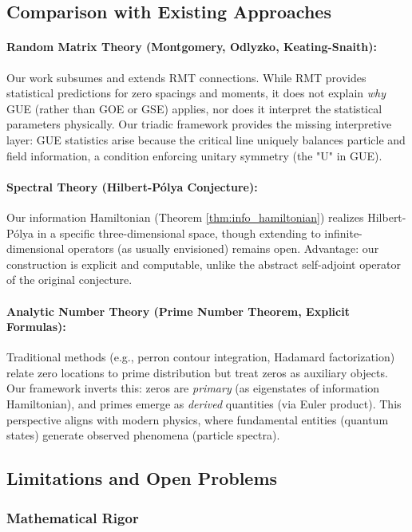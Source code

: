 \documentclass[12pt]{article}
\theoremstyle{plain}
\theoremstyle{definition}
\begin{document}
\subsection{Comparison with Existing Approaches}

\paragraph{Random Matrix Theory (Montgomery, Odlyzko, Keating-Snaith):}
Our work subsumes and extends RMT connections. While RMT provides statistical predictions for zero spacings and moments, it does not explain \emph{why} GUE (rather than GOE or GSE) applies, nor does it interpret the statistical parameters physically. Our triadic framework provides the missing interpretive layer: GUE statistics arise because the critical line uniquely balances particle and field information, a condition enforcing unitary symmetry (the "U" in GUE).

\paragraph{Spectral Theory (Hilbert-Pólya Conjecture):}
Our information Hamiltonian (Theorem \ref{thm:info_hamiltonian}) realizes Hilbert-Pólya in a specific three-dimensional space, though extending to infinite-dimensional operators (as usually envisioned) remains open. Advantage: our construction is explicit and computable, unlike the abstract self-adjoint operator of the original conjecture.

\paragraph{Analytic Number Theory (Prime Number Theorem, Explicit Formulas):}
Traditional methods (e.g., perron contour integration, Hadamard factorization) relate zero locations to prime distribution but treat zeros as auxiliary objects. Our framework inverts this: zeros are \emph{primary} (as eigenstates of information Hamiltonian), and primes emerge as \emph{derived} quantities (via Euler product). This perspective aligns with modern physics, where fundamental entities (quantum states) generate observed phenomena (particle spectra).

\subsection{Limitations and Open Problems}

\subsubsection{Mathematical Rigor}
\end{document}
